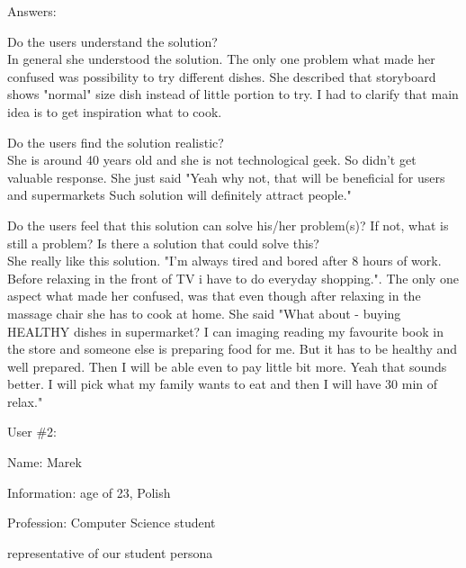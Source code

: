 \documentclass[a4paper,10pt,oneside]{scrreprt}
\begin{document}
Answers:
\begin{compactitem}
	\item Do the users understand the solution?\\
	In general she understood the solution. The only one problem what made her confused was possibility to try different dishes. She described that storyboard shows "normal" size dish instead of little portion to try. I had to clarify that main idea is to get inspiration what to cook.\\
	
	
	\item Do the users find the solution realistic?\\
	She is around 40 years old and she is not technological geek. So didn't get valuable response. She just said "Yeah why not, that will be beneficial for users and supermarkets Such solution will definitely attract people."\\
	
	\item Do the users feel that this solution can solve his/her problem(s)? If not, what is still
	a problem? Is there a solution that could solve this?\\
	She really like this solution. "I'm always tired and bored after 8 hours of work. Before relaxing in the front of TV i have to do everyday shopping.". The only one aspect what made her confused, was that even though after relaxing in the massage chair she has to cook at home. She said "What about - buying HEALTHY dishes in supermarket? I can imaging reading my favourite book in the store and someone else is preparing food for me. But it has to be healthy and well prepared. Then I will be able even to pay little bit more. Yeah that sounds better. I will pick what my family wants to eat and then I will have 30 min of relax."
\\
\end{compactitem}
\bigskip

User \#2:
\begin{compactitem}
	\item Name: Marek
	\item Information: age of 23, Polish
	\item Profession: Computer Science student
	\item representative of our student persona
\end{compactitem}
\bigskip
\end{document}
